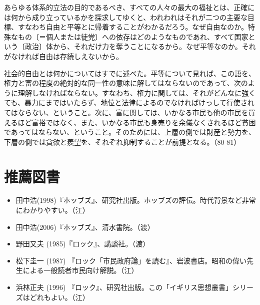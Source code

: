あらゆる体系的立法の目的であるべき、すべての人々の最大の福祉とは、正確には何から成り立っているかを探求してゆくと、われわれはそれが二つの主要な目標、すなわち自由と平等とに帰着することがわかるだろう。なぜ自由なのか。特殊なもの〔＝個人または徒党〕への依存はどのようなものであれ、すべて国家という〔政治〕体から、それだけ力を奪うことになるから。なぜ平等なのか。それがなければ自由は存続しえないから。

社会的自由とは何かについてはすでに述べた。平等について見れば、この語を、権力と富の程度の絶対的な同一性の意味に解してはならないのであって、次のように理解しなければならない。すなわち、権力に関しては、それがどんなに強くても、暴力にまではいたらず、地位と法律によるのでなければけっして行使されてはならない、ということ。次に、富に関しては、いかなる市民も他の市民を買えるほど富裕ではなく、また、いかなる市民も身売りを余儀なくされるほど貧困であってはならない、ということ。そのためには、上層の側では財産と勢力を、下層の側では貪欲と羨望を、それぞれ抑制することが前提となる。（80-81）


\vspace{2zw}

\section{推薦図書}



\begin{itemize}
\item 田中浩(1998)『ホッブズ』、研究社出版。ホッブズの評伝。時代背景など非常にわかりやすい。（江）
\item 田中浩(2006)『ホッブズ』、清水書院。（渡）
\item 野田又夫 (1985)『ロック』、講談社。（渡）
\item 松下圭一 (1987) 『ロック「市民政府論」を読む』、岩波書店。昭和の偉い先生による一般読者市民向け解説。（江）
\item 浜林正夫 (1996) 『ロック』、研究社出版。この「イギリス思想叢書」シリーズはどれもよい。（江）
\end{itemize}




